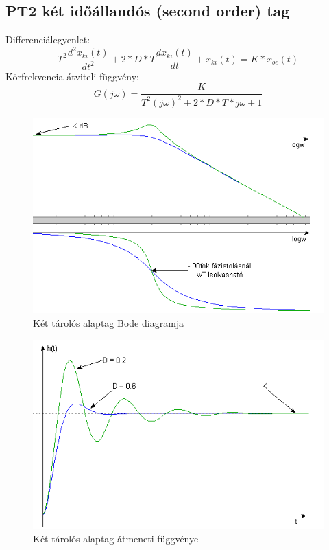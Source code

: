 \documentclass[11pt,a4paper]{article}
\begin{document}
\subsection{PT2 két időállandós (second order) tag}
Differenciálegyenlet:$$T^2 \frac{d^2 x_{ki}\left(t\right)}{dt^2} + 2 * D * T\frac{dx_{ki}\left(t\right)}{dt} + x_{ki}\left(t\right) = K * x_{be}\left(t\right)$$
Körfrekvencia átviteli függvény:$$G\left(j\omega\right) = \frac{K}{T^2\left(j\omega\right)^2 + 2 * D * T * j\omega + 1}$$
\begin{figure}[hbtp]
    	 \centering
		\includegraphics[scale=1.0]{34_pt2_tag_bode.png}
		\caption{Két tárolós alaptag Bode diagramja}
\end{figure}
\begin{figure}[hbtp]
    	 \centering
		\includegraphics[scale=1.0]{35_pt2_tag_atmenet.png}
		\caption{Két tárolós alaptag átmeneti függvénye}
\end{figure}
\newpage
\end{document}
